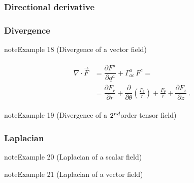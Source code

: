 \documentclass[letterpaper,10pt,english]{jupyterBook}
\begin{document}
\subsubsection{Directional derivative}
\label{\detokenize{ch/tensor-algebra-calculus/calculus-euclidean-cylindrical:directional-derivative}}\label{\detokenize{ch/tensor-algebra-calculus/calculus-euclidean-cylindrical:tensor-calculus-cylindrical-differential-operators-directional-der}}

\subsubsection{Divergence}
\label{\detokenize{ch/tensor-algebra-calculus/calculus-euclidean-cylindrical:divergence}}\label{\detokenize{ch/tensor-algebra-calculus/calculus-euclidean-cylindrical:tensor-calculus-cylindrical-differential-operators-divergence}}\label{ch/tensor-algebra-calculus/calculus-euclidean-cylindrical:example-3}
\begin{sphinxadmonition}{note}{Example 18 (Divergence of a vector field)}


\begin{equation*}
\begin{split}\begin{aligned}
  \nabla \cdot \vec{F} 
  & = \dfrac{\partial F^a}{\partial q^a} + \Gamma_{ac}^a \, F^c = \\
  & = \dfrac{\partial F_r}{\partial r} + \dfrac{\partial}{\partial \theta}\left( \frac{F_\theta}{r} \right) + \frac{F_\theta}{r} + \dfrac{\partial F_z}{\partial z} \ .
\end{aligned}\end{split}
\end{equation*}\end{sphinxadmonition}
\label{ch/tensor-algebra-calculus/calculus-euclidean-cylindrical:example-4}
\begin{sphinxadmonition}{note}{Example 19 (Divergence of a \protect\(2^{nd}\protect\)\sphinxhyphen{}order tensor field)}


\end{sphinxadmonition}


\subsubsection{Laplacian}
\label{\detokenize{ch/tensor-algebra-calculus/calculus-euclidean-cylindrical:laplacian}}\label{ch/tensor-algebra-calculus/calculus-euclidean-cylindrical:example-5}
\begin{sphinxadmonition}{note}{Example 20 (Laplacian of a scalar field)}


\end{sphinxadmonition}
\label{ch/tensor-algebra-calculus/calculus-euclidean-cylindrical:example-6}
\begin{sphinxadmonition}{note}{Example 21 (Laplacian of a vector field)}


\end{sphinxadmonition}
\end{document}
